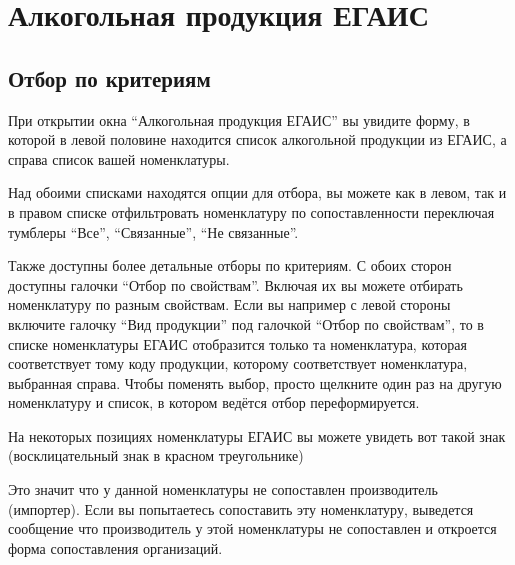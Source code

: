 \documentclass[letterpaper,10pt,russian]{sphinxmanual}
\begin{document}
\chapter{Алкогольная продукция ЕГАИС}
\label{alcprod::doc}\label{alcprod:id1}

\section{Отбор по критериям}
\label{alcprod:id2}
При открытии окна ``Алкогольная продукция ЕГАИС'' вы увидите форму, в которой в левой половине находится список алкогольной продукции из ЕГАИС, а справа список вашей номенклатуры.
\begin{figure}[htbp]
\centering

\noindent{}
\end{figure}

Над обоими списками находятся опции для отбора, вы можете как в левом, так и в правом списке отфильтровать номенклатуру по сопоставленности переключая тумблеры ``Все'', ``Связанные'', ``Не связанные''.

Также доступны более детальные отборы по критериям. С обоих сторон доступны галочки ``Отбор по свойствам''. Включая их вы можете отбирать номенклатуру по разным свойствам. Если вы например с левой стороны включите галочку ``Вид продукции'' под галочкой ``Отбор по свойствам'', то в списке номенклатуры ЕГАИС отобразится только та номенклатура, которая соответствует тому коду продукции, которому соответствует номенклатура, выбранная справа. Чтобы поменять выбор, просто щелкните один раз на другую номенклатуру и список, в котором ведётся отбор переформируется.
\begin{figure}[htbp]
\centering

\noindent{}
\end{figure}

На некоторых позициях номенклатуры ЕГАИС вы можете увидеть вот такой знак (восклицательный знак в красном треугольнике)
\begin{figure}[htbp]
\centering

\noindent{}
\end{figure}

Это значит что у данной номенклатуры не сопоставлен производитель (импортер). Если вы попытаетесь сопоставить эту номенклатуру, выведется сообщение что производитель у этой номенклатуры не сопоставлен и откроется форма сопоставления организаций.
\end{document}
